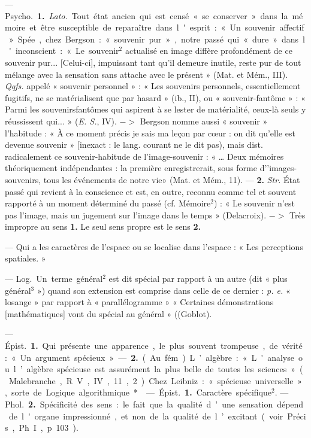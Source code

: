 \begin{itemize}[leftmargin=1cm, label=, itemsep=1pt]
 — \si{Psycho.} {\bf 1.} {\it Lato.} Tout état
ancien qui est censé « se conserver »
dans la mémoire et être susceptible
de reparaître dans l'esprit : « Un
souvenir affectif » Spée., chez
Bergson : « souvenir pur », notre
passé qui « dure» dans l'inconscient :
« Le souvenir$^2$ actualisé en image
diffère profondément de ce souvenir pur... [Celui-ci], impuissant
tant qu'il demeure inutile, reste
pur de tout mélange avec la sensation sans attache avec le présent »
(Mat. et Mém., III). {\it Qqfs.} appelé
« souvenir personnel » : « Les souvenirs personnels, essentiellement
fugitifs, ne se matérialisent que par
hasard » (ib., II), ou « souvenir-fantôme » : « Parmi les souvenirsfantômes qui aspirent à se lester de
matérialité, ceux-là seuls y réussissent qui... » ({\it E. S.}, IV). $->$ Bergson
nomme aussi « souvenir » l'habitude : « À ce moment précis je sais
ma leçon par cœur : on dit qu’elle
est devenue souvenir » [inexact : le
lang. courant ne le dit pas), mais
dist. radicalement ce souvenir-habitude de l'image-souvenir : « … Deux
mémoires théoriquement indépendantes : la première enregistrerait,
sous forme d’'images-souvenirs, tous
les événements de notre vie» (Mat. et
Mém., 11). — {\bf 2.} {\it Str.} État passé qui
revient à la conscience et est, en
outre, reconnu comme tel et souvent rapporté à un moment déterminé du passé (cf. Mémoire$^2$) : « Le
souvenir n’est pas l’image, mais un
jugement sur l’image dans le temps »
(Delacroix). $->$ Très impropre au
sens {\bf 1.} Le seul sens propre est le
sens {\bf 2.}

 — Qui a les caractères de
l’espace ou se localise dans l’espace :
« Les perceptions spatiales. »

 — \si{Log.} Un terme général$^2$ est
dit spécial par rapport à un autre
(dit « plus général$^3$ ») quand son
extension est comprise dans celle
de ce dernier : {\it p. e.} « losange » par
rapport à « parallélogramme »
« Certaines démonstrations [mathématiques] vont du spécial au
général » ((Goblot).

 — \si{Épist.} {\bf 1.} Qui présente une
apparence, le plus souvent trompeuse, de vérité : « Un argument
spécieux ». — {\bf 2.} (Au fém.). L’algèbre :
« L'analyse ou l’algèbre spécieuse est assurément la plus belle
de toutes les sciences » (Malebranche, R. V., IV, 11, 2). Chez Leibniz :
« spécieuse universelle », sorte de
Logique algorithmique*.

 — \si{Épist.} {\bf 1.} Caractère spécifique$^2$. — \si{Phol.} {\bf 2.} Spécificité des
sens : le fait que la qualité d’une
sensation dépend de l'organe impressionné, et non de la qualité de
l’excitant (voir Précis, Ph. I, p. 103).


\end{itemize}

